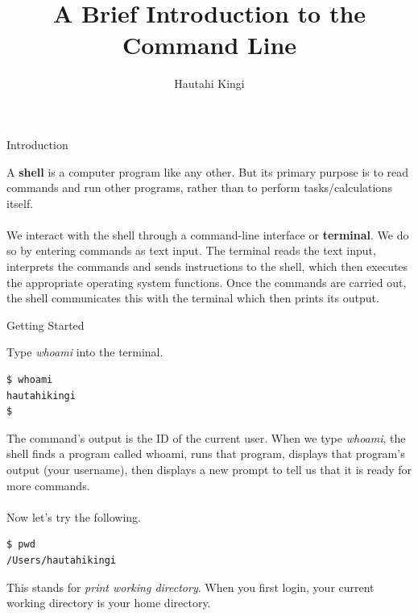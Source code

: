 \documentclass[10pt,leqno]{beamer}
\begin{document}
\title{A Brief Introduction to the Command Line}
\author{Hautahi Kingi}
\date{}


\maketitle
\begin{frame}[fragile]{Introduction}

A \textbf{shell} is a computer program like any other. But its primary purpose is to read commands and run other programs, rather than to perform tasks/calculations itself.\\~\\


We interact with the shell through a command-line interface or \textbf{terminal}. We do so by entering commands as text input. The terminal reads the text input, interprets the commands and sends instructions to the shell, which then executes the appropriate operating system functions. Once the commands are carried out, the shell communicates this with the terminal which then prints its output.

\end{frame}


\begin{frame}[fragile]{Getting Started}

Type \emph{whoami} into the terminal.
\begin{lstlisting}
$ whoami
hautahikingi
$ 
\end{lstlisting}
The command's output is the ID of the current user. When we type \emph{whoami}, the shell finds a program called whoami, runs that program, displays that program's output (your username), then displays a new prompt to tell us that it is ready for more commands.\\~\\

Now let's try the following.
\begin{lstlisting}
$ pwd
/Users/hautahikingi
\end{lstlisting}
This stands for \emph{print working directory}. When you first login, your current working directory is your home directory.


\end{frame}
\end{document}
